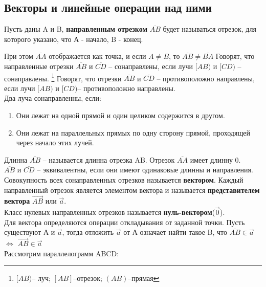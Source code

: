 \documentclass[oneside]{book}
\begin{document}
\begin{itemize}
\begin{enumerate}
\setcounter{chapter}{39}
\chapter{Векторы и линейные операции над ними}

	Пусть даны A и B,  \textbf{направленным отрезком} $\overline{AB}$ будет называться отрезок, для которого указано, что А - начало, B - конец. 
	
	При этом $\overline {AA}$ отображается как точка, и если $A\ne B$, то $\overline {AB} \ne \overline {BA}$
	Говорят, что направленные отрезки $\overline {AB}$ и $\overline {CD}$ -- сонаправлены, если лучи $[AB)$ и $[CD)$ -- сонаправлены. \footnote{$[AB)$-- луч; $[AB]$--отрезок; $(AB)$--прямая}
	Говорят, что отрезки $\overline {AB}$ и $\overline {CD}$ -- противоположно направлены, если лучи $[AB)$ и $[CD)$-- противоположно направлены.\\
	
	Два луча сонаправленны, если:
	\begin{enumerate}
		\item Они лежат на одной прямой и один целиком содержится в другом.
		\item Они лежат на параллельных прямых по одну сторону прямой, проходящей через начало этих лучей.
	\end{enumerate}
Длинна $\overline {AB}$ -- называется длинна отрезка AB. Отрезок $\overline {AA}$ имеет длинну 0.\\
$\overline {AB}$ и $\overline {CD}$ -- эквивалентны, если они имеют одинаковые длинны и направления. Совокупность всех сонаправленных отрезков называется \textbf{вектором}. Каждый направленный отрезок является элементом вектора и называется \textbf{представителем вектора} $\vec{AB}$ или $\vec{a}$.\\
Класс нулевых направленных отрезков называется \textbf{нуль-вектором}($\vec{0}$).\\
Для вектора определяются операции откладывания от заданной точки. Пусть существуют А и $\vec{a}$, тогда отложить $\vec{a}$ от А означает найти такое B, что $\overline{AB} \in \vec{a}$ $\iff$ $\vec{AB} \in \vec{a}$\\ 
Рассмотрим параллелограмм ABCD:
\end{enumerate}
\end{itemize}
\end{document}
